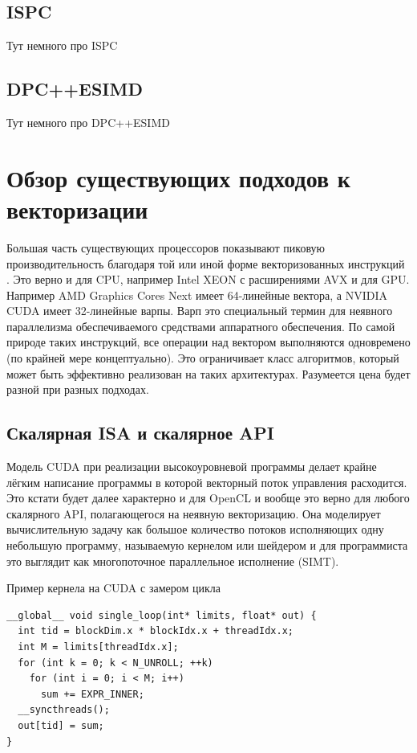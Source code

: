 \subsection{ISPC}\label{subsec:overview/vectorapi/ispc}

Тут немного про ISPC

\subsection{DPC++ESIMD}\label{subsec:overview/vectorapi/dpcppesimd}

Тут немного про DPC++ESIMD

\section{Обзор существующих подходов к векторизации}\label{sec:overview/vectorizing}

Большая часть существующих процессоров показывают пиковую производительность благодаря той или иной форме векторизованных инструкций \cite{bialas2015benchmarking}. Это верно и для CPU, например Intel XEON с расширениями AVX и для GPU. Например AMD Graphics Cores Next имеет 64-линейные вектора, а NVIDIA CUDA имеет 32-линейные варпы. Варп \cite{passerat2015warp} это специальный термин для неявного параллелизма обеспечиваемого средствами аппаратного обеспечения. По самой природе таких инструкций, все операции над вектором выполняются одновремено (по крайней мере концептуально). Это ограничивает класс алгоритмов, который может быть эффективно реализован на таких архитектурах. Разумеется цена будет разной при разных подходах.

\subsection{Скалярная ISA и скалярное API}\label{subsec:overview/vectorizing/cuda}

Модель CUDA при реализации высокоуровневой программы делает крайне лёгким написание программы в которой векторный поток управления расходится. Это кстати будет далее характерно и для OpenCL и вообще это верно для любого скалярного API, полагающегося на неявную векторизацию. Она моделирует вычислительную задачу как большое количество потоков исполняющих одну небольшую программу, называемую кернелом или шейдером и для программиста это выглядит как многопоточное параллельное исполнение (SIMT).

\begin{ListingEnv}[!h]
    \captiondelim{ } 
    \caption{Пример кернела на CUDA с замером цикла}\label{lst:cudashader}
    \begin{lstlisting}[language={[ISO]C++}]
__global__ void single_loop(int* limits, float* out) {
  int tid = blockDim.x * blockIdx.x + threadIdx.x;
  int M = limits[threadIdx.x];
  for (int k = 0; k < N_UNROLL; ++k)
    for (int i = 0; i < M; i++)
      sum += EXPR_INNER;
  __syncthreads();
  out[tid] = sum;
}
    \end{lstlisting}
\end{ListingEnv}

